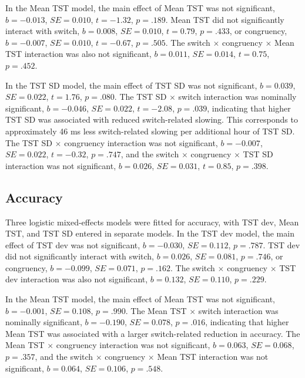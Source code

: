 \documentclass[12pt,a4paper]{report}
\begin{document}
In the Mean TST model, the main effect of Mean TST was not significant, \(b = -0.013\), \(SE = 0.010\), \(t = -1.32\), \(p = .189\). Mean TST did not significantly interact with switch, \(b = 0.008\), \(SE = 0.010\), \(t = 0.79\), \(p = .433\), or congruency, \(b = -0.007\), \(SE = 0.010\), \(t = -0.67\), \(p = .505\). The switch \(\times\) congruency \(\times\) Mean TST interaction was also not significant, \(b = 0.011\), \(SE = 0.014\), \(t = 0.75\), \(p = .452\).

In the TST SD model, the main effect of TST SD was not significant, \(b = 0.039\), \(SE = 0.022\), \(t = 1.76\), \(p = .080\). The TST SD \(\times\) switch interaction was nominally significant, \(b = -0.046\), \(SE = 0.022\), \(t = -2.08\), \(p = .039\), indicating that higher TST SD was associated with reduced switch-related slowing. This corresponds to approximately 46 ms less switch-related slowing per additional hour of TST SD. The TST SD \(\times\) congruency interaction was not significant, \(b = -0.007\), \(SE = 0.022\), \(t = -0.32\), \(p = .747\), and the switch \(\times\) congruency \(\times\) TST SD interaction was not significant, \(b = 0.026\), \(SE = 0.031\), \(t = 0.85\), \(p = .398\).


\subsection{Accuracy}

Three logistic mixed-effects models were fitted for accuracy, with TST dev, Mean TST, and TST SD entered in separate models. In the TST dev model, the main effect of TST dev was not significant, \(b = -0.030\), \(SE = 0.112\), \(p = .787\). TST dev did not significantly interact with switch, \(b = 0.026\), \(SE = 0.081\), \(p = .746\), or congruency, \(b = -0.099\), \(SE = 0.071\), \(p = .162\). The switch \(\times\) congruency \(\times\) TST dev interaction was also not significant, \(b = 0.132\), \(SE = 0.110\), \(p = .229\).

In the Mean TST model, the main effect of Mean TST was not significant, \(b = -0.001\), \(SE = 0.108\), \(p = .990\). The Mean TST \(\times\) switch interaction was nominally significant, \(b = -0.190\), \(SE = 0.078\), \(p = .016\), indicating that higher Mean TST was associated with a larger switch-related reduction in accuracy. The Mean TST \(\times\) congruency interaction was not significant, \(b = 0.063\), \(SE = 0.068\), \(p = .357\), and the switch \(\times\) congruency \(\times\) Mean TST interaction was not significant, \(b = 0.064\), \(SE = 0.106\), \(p = .548\).
\end{document}
